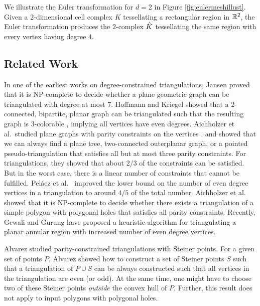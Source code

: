 \medskip
We illustrate the Euler transformation for $d=2$ in Figure \ref{fig:eulermeshillust}.
Given a $2$-dimensional cell complex $K$ tessellating a rectangular region in ${\mathbb R}^2$, the Euler transformation produces the $2$-complex $\hat{K}$ tessellating the same region with every vertex having degree $4$.

\subsection{Related Work} \label{ssec:relwork}
\vspace*{-0.05in}

In one of the earliest works on degree-constrained triangulations, Jansen \cite{Ja1993} proved that it is NP-complete to decide whether a plane geometric graph can be triangulated with degree at most $7$.
Hoffmann and Kriegel showed that a $2$-connected, bipartite, planar graph can be triangulated such that the resulting graph is $3$-colorable \cite{HoKr1996}, implying all vertices have even degrees.
Aichholzer et al.~studied plane graphs with parity constraints on the vertices \cite{AiHaHoPiRoSpVo2009,AiHaHoPiRoSpVo2014}, and showed that we can always find a plane tree, two-connected outerplanar graph, or a pointed pseudo-triangulation that satisfies all but at most three parity constraints.
For triangulations, they showed that about $2/3$ of the constraints can be satisfied. But in the worst case, there is a linear number of constraints that cannot be fulfilled.
Pel\'aez et al.~\cite{PeRaUr2010} improved the lower bound on the number of even degree vertices in a triangulation to around $4/5$ of the total number.
Aichholzer et al.~\cite{AiHaHoPiRoSpVo2014} showed that it is NP-complete to decide whether there exists a triangulation of a simple polygon with polygonal holes that satisfies all parity constraints.
Recently, Gewali and Gurung \cite{GeGu2018} have proposed a heuristic algorithm for triangulating a planar annular region with increased number of even degree vertices.

Alvarez \cite{Al2015} studied parity-constrained triangulations with Steiner points.
For a given set of points $P$, Alvarez showed how to construct a set of Steiner points $S$ such that a triangulation of $P \cup S$ can be always constructed such that all vertices in the triangulation are even (or odd).
At the same time, one might have to choose two of these Steiner points \emph{outside} the convex hull of $P$.
Further, this result does not apply to input polygons with polygonal holes.

